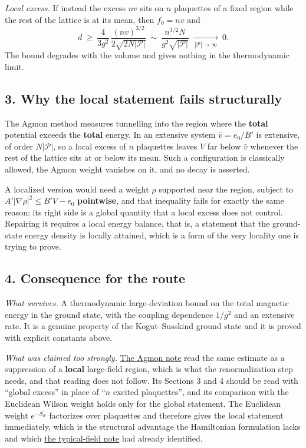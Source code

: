 \documentclass[11pt,a4paper]{article}
\begin{document}
\emph{Local excess.} If instead the excess \(nv\) sits on \(n\)
plaquettes of a fixed region while the rest of the lattice is at its
mean, then \(f_0=nv\) and
\[d\ \ge\ \frac{4}{3g^2}\,\frac{(nv)^{3/2}}{2\sqrt{2N|\mathcal P|}}
\ \sim\ \frac{n^{3/2}N}{g^2\sqrt{|\mathcal P|}}\ \xrightarrow[\ |\mathcal P|\to\infty\ ]{}\ 0 .\]
The bound degrades with the volume and gives nothing in the
thermodynamic limit.

\hypertarget{why-the-local-statement-fails-structurally}{%
\subsection{3. Why the local statement fails
structurally}\label{why-the-local-statement-fails-structurally}}

The Agmon method measures tunnelling into the region where the
\textbf{total} potential exceeds the \textbf{total} energy. In an
extensive system \(\bar v=e_0/B'\) is extensive, of order
\(N|\mathcal P|\), so a local excess of \(n\) plaquettes leaves \(V\)
far below \(\bar v\) whenever the rest of the lattice sits at or below
its mean. Such a configuration is classically allowed, the Agmon weight
vanishes on it, and no decay is asserted.

A localized version would need a weight \(\rho\) supported near the
region, subject to \(A'|\nabla\rho|^2\le B'V-e_0\) \textbf{pointwise},
and that inequality fails for exactly the same reason: its right side is
a global quantity that a local excess does not control. Repairing it
requires a local energy balance, that is, a statement that the
ground-state energy density is locally attained, which is a form of the
very locality one is trying to prove.

\hypertarget{consequence-for-the-route}{%
\subsection{4. Consequence for the
route}\label{consequence-for-the-route}}

\emph{What survives.} A thermodynamic large-deviation bound on the total
magnetic energy in the ground state, with the coupling dependence
\(1/g^2\) and an extensive rate. It is a genuine property of the
Kogut--Susskind ground state and it is proved with explicit constants
above.

\emph{What was claimed too strongly.}
\href{agmon-ground-state-suppression.md}{The Agmon note} read the same
estimate as a suppression of a \textbf{local} large-field region, which
is what the renormalization step needs, and that reading does not
follow. Its Sections 3 and 4 should be read with ``global excess'' in
place of ``\(n\) excited plaquettes'', and its comparison with the
Euclidean Wilson weight holds only for the global statement. The
Euclidean weight \(e^{-S_w}\) factorizes over plaquettes and therefore
gives the local statement immediately, which is the structural advantage
the Hamiltonian formulation lacks and which
\href{typical-field-strength-window.md}{the typical-field note} had
already identified.
\end{document}
